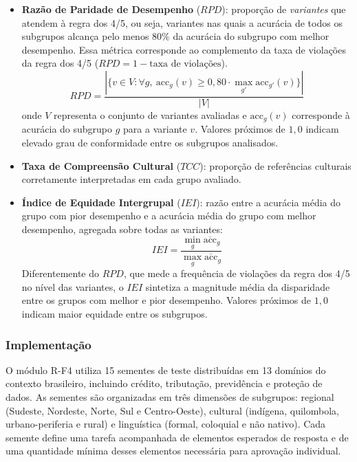 \begin{itemize}
    \item \textbf{Razão de Paridade de Desempenho} ($RPD$): proporção de \emph{variantes} que atendem à regra dos 4/5, ou seja, variantes nas quais a acurácia de todos os subgrupos alcança pelo menos $80\%$ da acurácia do subgrupo com melhor desempenho. Essa métrica corresponde ao complemento da taxa de violações da regra dos 4/5 ($RPD = 1 - \text{taxa de violações}$).
    \begin{equation}
    RPD = \frac{|\{v \in V : \forall g,\ \text{acc}_g(v) \ge 0{,}80 \cdot \max_{g'} \text{acc}_{g'}(v)\}|}{|V|}
    \end{equation}
    onde $V$ representa o conjunto de variantes avaliadas e $\text{acc}_g(v)$ corresponde à acurácia do subgrupo $g$ para a variante $v$. Valores próximos de $1{,}0$ indicam elevado grau de conformidade entre os subgrupos analisados.

    \item \textbf{Taxa de Compreensão Cultural} ($TCC$): proporção de referências culturais corretamente interpretadas em cada grupo avaliado.

    \item \textbf{Índice de Equidade Intergrupal} ($IEI$): razão entre a acurácia média do grupo com pior desempenho e a acurácia média do grupo com melhor desempenho, agregada sobre todas as variantes:
    \[
    IEI = \frac{\min_g \overline{\text{acc}}_g}{\max_g \overline{\text{acc}}_g}
    \]
    Diferentemente do $RPD$, que mede a frequência de violações da regra dos 4/5 no nível das variantes, o $IEI$ sintetiza a magnitude média da disparidade entre os grupos com melhor e pior desempenho. Valores próximos de $1{,}0$ indicam maior equidade entre os subgrupos.
\end{itemize}

\subsubsection{Implementação}

O módulo R-F4 utiliza 15 sementes de teste distribuídas em 13 domínios do contexto brasileiro, incluindo crédito, tributação, previdência e proteção de dados. As sementes são organizadas em três dimensões de subgrupos: regional (Sudeste, Nordeste, Norte, Sul e Centro-Oeste), cultural (indígena, quilombola, urbano-periferia e rural) e linguística (formal, coloquial e não nativo). Cada semente define uma tarefa acompanhada de elementos esperados de resposta e de uma quantidade mínima desses elementos necessária para aprovação individual.


